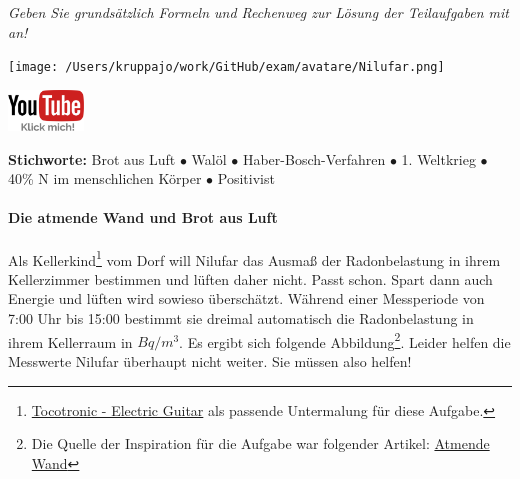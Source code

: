 \documentclass[a4paper, 9pt]{scrartcl}\usepackage[]{graphicx}\usepackage[]{xcolor}
\begin{document}
\textit{Geben Sie grundsätzlich Formeln und Rechenweg zur Lösung der Teilaufgaben mit an!} \\[1Ex]
 

 
\ifcollection
\begin{flushright}
\tiny\vspace{-3Ex}
\textbf{\examinhaltstart}
\exammodulemathstat
\vspace{-4Ex}
\end{flushright}
\begin{minipage}[t]{0.5\textwidth}
\texttt{[image: /Users/kruppajo/work/GitHub/exam/avatare/Nilufar.png]}
\end{minipage}
\begin{minipage}[t]{0.5\textwidth}
\hfill
\href{https://youtu.be/4-dSaPMhK9s}{\includegraphics[width = 2cm]{img/youtube}}
\end{minipage}
\fi

{\tiny\textbf{Stichworte:} Brot aus Luft $\bullet$ Walöl $\bullet$ Haber-Bosch-Verfahren $\bullet$ 1. Weltkrieg $\bullet$ 40\% N im menschlichen Körper $\bullet$ Positivist}



\ifcollection
\paragraph{Die atmende Wand und Brot aus Luft}
\fi



Als Kellerkind\footnote{\href{https://www.youtube.com/watch?v=54H0HAJexVI}{Tocotronic - Electric Guitar} als passende Untermalung für diese Aufgabe.} vom Dorf will Nilufar das Ausmaß der Radonbelastung in ihrem Kellerzimmer bestimmen und lüften daher nicht. Passt schon. Spart dann auch Energie und lüften wird sowieso überschätzt. Während einer Messperiode von 7:00 Uhr bis 15:00 bestimmt sie dreimal automatisch die Radonbelastung in ihrem Kellerraum in $Bq/m^3$. Es ergibt sich folgende Abbildung\footnote{Die Quelle der Inspiration für die Aufgabe war folgender Artikel: \href{https://de.wikipedia.org/wiki/Atmende_Wand}{Atmende Wand}}. Leider helfen die Messwerte Nilufar überhaupt nicht weiter. Sie müssen also helfen! 
\end{document}
